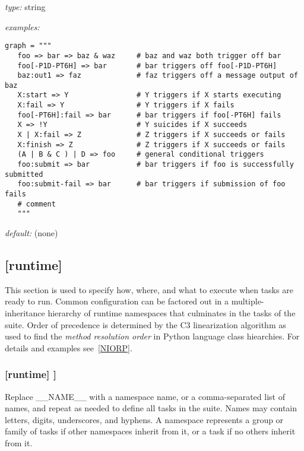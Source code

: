 \begin{myitemize}
\item {\em type:} string
\item {\em examples:}
  \begin{lstlisting}
graph = """
   foo => bar => baz & waz     # baz and waz both trigger off bar
   foo[-P1D-PT6H] => bar       # bar triggers off foo[-P1D-PT6H]
   baz:out1 => faz             # faz triggers off a message output of baz
   X:start => Y                # Y triggers if X starts executing
   X:fail => Y                 # Y triggers if X fails
   foo[-PT6H]:fail => bar      # bar triggers if foo[-PT6H] fails
   X => !Y                     # Y suicides if X succeeds
   X | X:fail => Z             # Z triggers if X succeeds or fails
   X:finish => Z               # Z triggers if X succeeds or fails
   (A | B & C ) | D => foo     # general conditional triggers
   foo:submit => bar           # bar triggers if foo is successfully submitted
   foo:submit-fail => bar      # bar triggers if submission of foo fails
   # comment
   """
  \end{lstlisting}
\item {\em default:} (none)
\end{myitemize}

\subsection{[runtime]}

This section is used to specify how, where, and what to execute when
tasks are ready to run. Common
configuration can be factored out in a multiple-inheritance hierarchy of
runtime namespaces that culminates in the tasks of the suite. Order of
precedence is determined by the C3 linearization algorithm as used to
find the {\em method resolution order} in Python language class
hiearchies. For details and examples see~\ref{NIORP}.

\subsubsection[{[[}\_\_NAME\_\_{]]}]{[runtime] \textrightarrow [[\_\_NAME\_\_]]}

Replace \_\_NAME\_\_ with a namespace name, or a comma-separated list of
names, and repeat as needed to define all tasks in the suite. Names may
contain letters, digits, underscores, and hyphens. A namespace
represents a group or family of tasks if other namespaces inherit from
it, or a task if no others inherit from it.

